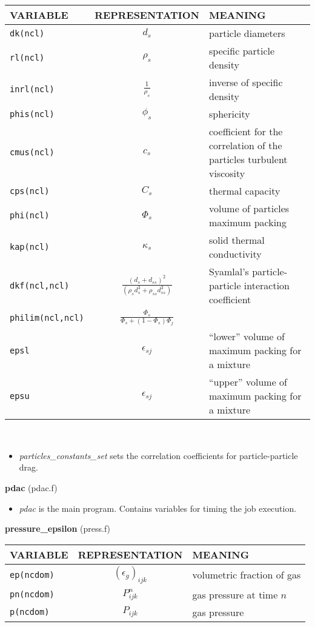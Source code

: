 \begin{tabular}{|p{6cm}|c|p{6cm}|}\hline
VARIABLE & REPRESENTATION & MEANING\\\hline
\tt dk(ncl) & $d_s$ &  particle diameters\\\hline
\tt rl(ncl) & $\rho_s$ & specific particle density\\\hline
\tt inrl(ncl)& $\frac{1}{\rho_s} $& inverse of specific density\\\hline
\tt phis(ncl)& $\phi_s$   & sphericity\\\hline
\tt cmus(ncl) & $c_s$ & coefficient for the correlation of the particles turbulent viscosity\\\hline
\tt cps(ncl) & $C_s$ &   thermal capacity\\\hline
\tt phi(ncl) & $\Phi_s$ & volume of particles maximum packing\\\hline
\tt kap(ncl) & $\kappa_s$ &  solid thermal conductivity\\\hline
\tt dkf(ncl,ncl) & $\frac{(d_s+d_{ss})^2}{(\rho_sd_s^3+\rho_{ss}d_{ss}^3)}$ &   Syamlal's particle-particle interaction coefficient \\\hline
\tt philim(ncl,ncl) &$ \frac{\Phi_s}{\Phi_s+(1-\Phi_s)\Phi_j}$& \\\hline
\tt epsl & $\epsilon_{sj}$ & ``lower'' volume of maximum packing for a mixture\\\hline
\tt epsu & $\epsilon_{sj}$ & ``upper'' volume of maximum packing for a mixture\\\hline
\end{tabular}\\
\begin{itemize}
\item{\em particles\_constants\_set} sets the correlation coefficients for particle-particle drag.
\end{itemize}
%
%
{\large{\bf pdac}} (pdac.f)\\[5mm]
\begin{itemize}
\item {\em pdac} is the main program. Contains variables for timing the job execution.
\end{itemize}
%
%
{\large{\bf pressure\_epsilon}} (press.f)\\[5mm]
\begin{tabular}{|p{6cm}|c|p{6cm}|}\hline
VARIABLE & REPRESENTATION & MEANING\\\hline
\tt ep(ncdom) & $(\epsilon_g)_{ijk}$ &  volumetric fraction of gas\\\hline
\tt pn(ncdom) & $P_{ijk}^{n}$ &  gas pressure at time $n$\\\hline
\tt p(ncdom) & $P_{ijk}$ &  gas pressure\\\hline
\end{tabular}\\[5mm]
